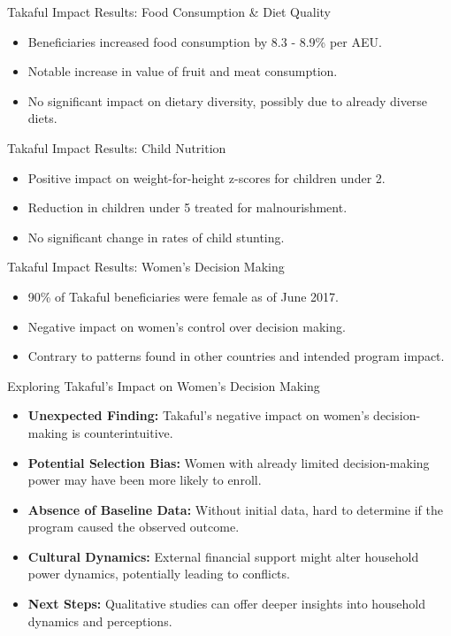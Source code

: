\documentclass{beamer}
\begin{document}
\begin{frame}{Takaful Impact Results: Food Consumption \& Diet Quality}
\begin{itemize}
    \item Beneficiaries increased food consumption by 8.3 - 8.9\% per AEU.
    \item Notable increase in value of fruit and meat consumption.
    \item No significant impact on dietary diversity, possibly due to already diverse diets.
\end{itemize}
\end{frame}

\begin{frame}{Takaful Impact Results: Child Nutrition}
\begin{itemize}
    \item Positive impact on weight-for-height z-scores for children under 2.
    \item Reduction in children under 5 treated for malnourishment.
    \item No significant change in rates of child stunting.
\end{itemize}
\end{frame}

\begin{frame}{Takaful Impact Results: Women’s Decision Making}
\begin{itemize}
    \item 90\% of Takaful beneficiaries were female as of June 2017.
    \item Negative impact on women’s control over decision making.
    \item Contrary to patterns found in other countries and intended program impact.
\end{itemize}
\end{frame}

\begin{frame}{Exploring Takaful's Impact on Women’s Decision Making}
\begin{itemize}
    \item \textbf{Unexpected Finding:} Takaful's negative impact on women’s decision-making is counterintuitive.
    \item \textbf{Potential Selection Bias:} Women with already limited decision-making power may have been more likely to enroll.
    \item \textbf{Absence of Baseline Data:} Without initial data, hard to determine if the program caused the observed outcome.
    \item \textbf{Cultural Dynamics:} External financial support might alter household power dynamics, potentially leading to conflicts.
    \item \textbf{Next Steps:} Qualitative studies can offer deeper insights into household dynamics and perceptions.
\end{itemize}
\end{frame}
\end{document}
